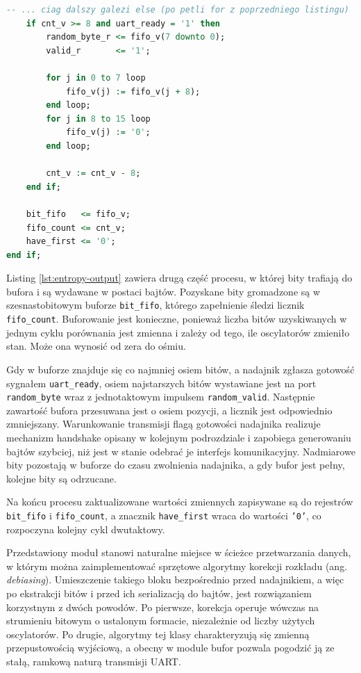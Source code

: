 \begin{lstlisting}[language=VHDL,
caption={Buforowanie i wydawanie bajtu (entropy\_mixer.vhdl)},
label={lst:entropy-output}]
    -- ... ciag dalszy galezi else (po petli for z poprzedniego listingu)
    if cnt_v >= 8 and uart_ready = '1' then
        random_byte_r <= fifo_v(7 downto 0);
        valid_r       <= '1';

        for j in 0 to 7 loop
            fifo_v(j) := fifo_v(j + 8);
        end loop;
        for j in 8 to 15 loop
            fifo_v(j) := '0';
        end loop;

        cnt_v := cnt_v - 8;
    end if;

    bit_fifo   <= fifo_v;
    fifo_count <= cnt_v;
    have_first <= '0';
end if;
\end{lstlisting}

Listing \ref{lst:entropy-output} zawiera drugą część procesu, w której bity
trafiają do bufora i są wydawane w postaci bajtów. Pozyskane bity gromadzone
są w szesnastobitowym buforze \texttt{bit\_fifo}, którego zapełnienie śledzi
licznik \texttt{fifo\_count}. Buforowanie jest konieczne, ponieważ liczba
bitów uzyskiwanych w jednym cyklu porównania jest zmienna i zależy od tego,
ile oscylatorów zmieniło stan. Może ona wynosić od zera do ośmiu.

Gdy w buforze znajduje się co najmniej osiem bitów, a nadajnik zgłasza
gotowość sygnałem \texttt{uart\_ready}, osiem najstarszych bitów wystawiane
jest na port \texttt{random\_byte} wraz z jednotaktowym impulsem
\texttt{random\_valid}. Następnie zawartość bufora przesuwana jest o osiem
pozycji, a licznik jest odpowiednio zmniejszany. Warunkowanie transmisji flagą
gotowości nadajnika realizuje mechanizm handshake opisany w kolejnym
podrozdziale i zapobiega generowaniu bajtów szybciej, niż jest w stanie
odebrać je interfejs komunikacyjny. Nadmiarowe bity pozostają w buforze do
czasu zwolnienia nadajnika, a gdy bufor jest pełny, kolejne bity są
odrzucane.

Na końcu procesu zaktualizowane wartości zmiennych zapisywane są do rejestrów
\texttt{bit\_fifo} i \texttt{fifo\_count}, a znacznik \texttt{have\_first}
wraca do wartości \texttt{'0'}, co rozpoczyna kolejny cykl dwutaktowy.

Przedstawiony moduł stanowi naturalne miejsce w ścieżce przetwarzania danych,
w którym można zaimplementować sprzętowe algorytmy korekcji rozkładu
(ang. \emph{debiasing}). Umieszczenie takiego bloku bezpośrednio przed
nadajnikiem, a więc po ekstrakcji bitów i przed ich serializacją do bajtów,
jest rozwiązaniem korzystnym z dwóch powodów. Po pierwsze, korekcja operuje
wówczas na strumieniu bitowym o ustalonym formacie, niezależnie od liczby
użytych oscylatorów. Po drugie, algorytmy tej klasy charakteryzują się
zmienną przepustowością wyjściową, a obecny w module bufor pozwala pogodzić
ją ze stałą, ramkową naturą transmisji UART.

